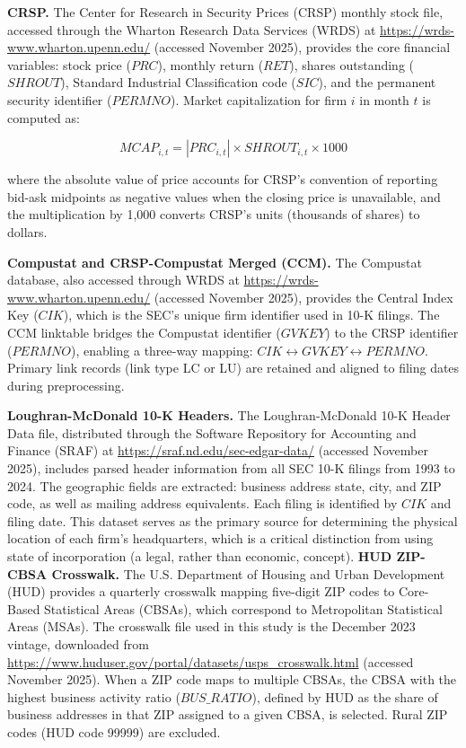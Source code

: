 \documentclass[
  12pt,
]{article}
\begin{document}
\textbf{CRSP.} The Center for Research in Security Prices (CRSP) monthly
stock file, accessed through the Wharton Research Data Services (WRDS)
at \url{https://wrds-www.wharton.upenn.edu/} (accessed November 2025),
provides the core financial variables: stock price (\(PRC\)), monthly
return (\(RET\)), shares outstanding (\(SHROUT\)), Standard Industrial
Classification code (\(SIC\)), and the permanent security identifier
(\(PERMNO\)). Market capitalization for firm \(i\) in month \(t\) is
computed as:

\[MCAP_{i,t} = |PRC_{i,t}| \times SHROUT_{i,t} \times 1000\]

\noindent where the absolute value of price accounts for CRSP's
convention of reporting bid-ask midpoints as negative values when the
closing price is unavailable, and the multiplication by 1,000 converts
CRSP's units (thousands of shares) to dollars.

\textbf{Compustat and CRSP-Compustat Merged (CCM).} The Compustat
database, also accessed through WRDS at
\url{https://wrds-www.wharton.upenn.edu/} (accessed November 2025),
provides the Central Index Key (\(CIK\)), which is the SEC's unique firm
identifier used in 10-K filings. The CCM linktable bridges the Compustat
identifier (\(GVKEY\)) to the CRSP identifier (\(PERMNO\)), enabling a
three-way mapping: \(CIK \leftrightarrow GVKEY \leftrightarrow PERMNO\).
Primary link records (link type LC or LU) are retained and aligned to
filing dates during preprocessing.

\textbf{Loughran-McDonald 10-K Headers.} The Loughran-McDonald 10-K
Header Data file, distributed through the Software Repository for
Accounting and Finance (SRAF) at
\url{https://sraf.nd.edu/sec-edgar-data/} (accessed November 2025),
includes parsed header information from all SEC 10-K filings from 1993
to 2024. The geographic fields are extracted: business address state,
city, and ZIP code, as well as mailing address equivalents. Each filing
is identified by \(CIK\) and filing date. This dataset serves as the
primary source for determining the physical location of each firm's
headquarters, which is a critical distinction from using state of
incorporation (a legal, rather than economic, concept). \textbf{HUD
ZIP-CBSA Crosswalk.} The U.S. Department of Housing and Urban
Development (HUD) provides a quarterly crosswalk mapping five-digit ZIP
codes to Core-Based Statistical Areas (CBSAs), which correspond to
Metropolitan Statistical Areas (MSAs). The crosswalk file used in this
study is the December 2023 vintage, downloaded from
\url{https://www.huduser.gov/portal/datasets/usps_crosswalk.html}
(accessed November 2025). When a ZIP code maps to multiple CBSAs, the
CBSA with the highest business activity ratio (\(BUS\_RATIO\)), defined
by HUD as the share of business addresses in that ZIP assigned to a
given CBSA, is selected. Rural ZIP codes (HUD code 99999) are excluded.
\end{document}
